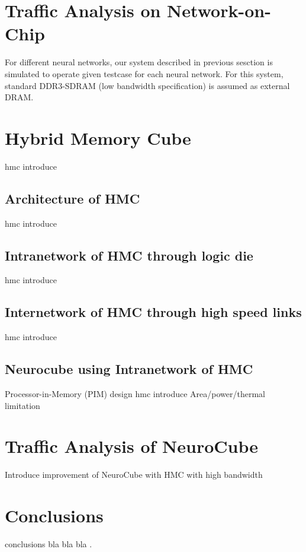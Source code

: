 \documentclass[pageno]{jpaper}
\begin{document}
\section{Traffic Analysis on Network-on-Chip}
For different neural networks, our system described in previous sesction is simulated to operate given testcase for each neural network. For this system, standard DDR3-SDRAM (low bandwidth specification) is assumed as external DRAM.


\section{Hybrid Memory Cube}
hmc introduce
\subsection{Architecture of HMC}
hmc introduce
\subsection{Intranetwork of HMC through logic die}
hmc introduce
\subsection{Internetwork of HMC through high speed links}
hmc introduce
\subsection{Neurocube using Intranetwork of HMC}
Processor-in-Memory (PIM) design hmc introduce
Area/power/thermal limitation

\section{Traffic Analysis of NeuroCube}
Introduce improvement of NeuroCube with HMC with high bandwidth


\section{Conclusions}
conclusions 
bla bla bla \cite{basheer2000artificial}.


\pagebreak



\end{document}
